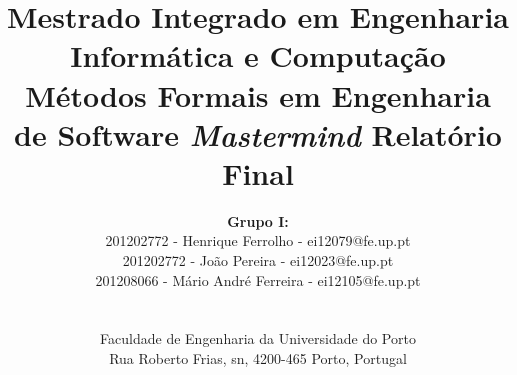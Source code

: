 \documentclass{article}
\begin{document}
\begin{titlepage} 

\setlength{\textwidth}{16cm}
\setlength{\textheight}{22cm}

\title{
    \linebreak
    \linebreak
    \Large{Mestrado Integrado em Engenharia Informática e Computação}
    \linebreak
    \linebreak
    \linebreak
    \Large\textbf{Métodos Formais em Engenharia de Software}
    \linebreak
    \linebreak
    \linebreak
    \Huge\textbf{\textit{Mastermind}}
    \linebreak
    \Large{Relatório Final}
    \linebreak
    \linebreak
}

\author{
    \textbf{Grupo I:}\\
    201202772 - Henrique Ferrolho - ei12079@fe.up.pt\\
    201202772 - João Pereira - ei12023@fe.up.pt\\
    201208066 - Mário André Ferreira - ei12105@fe.up.pt\\
    \linebreak
    \linebreak
    \\
    \\ Faculdade de Engenharia da Universidade do Porto \\ Rua Roberto Frias, s\/n, 4200-465 Porto, Portugal
    \linebreak
    \linebreak
    \linebreak
    \linebreak
    \linebreak
    \vspace{1cm}
}

\maketitle
\thispagestyle{empty}

\end{titlepage}

\newpage


\tableofcontents
\end{document}
